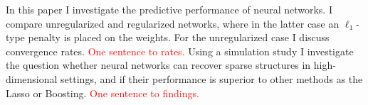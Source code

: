 In this paper I investigate the predictive performance of neural networks. I compare
unregularized and regularized networks, where in the latter case an $\ell_1$-type
penalty is placed on the weights. For the unregularized case I discuss convergence
rates.
\textcolor{red}{One sentence to rates.}
Using a simulation study I investigate the question whether neural networks can
recover sparse structures in high-dimensional settings, and if their performance is
superior to other methods as the Lasso or Boosting.
\textcolor{red}{One sentence to findings.}
